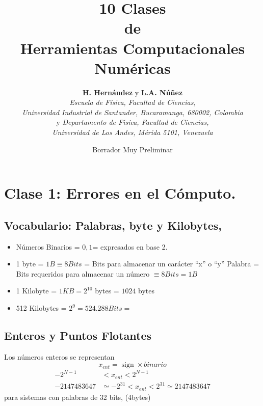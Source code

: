 \documentclass[spanish,titlepage,11pt]{article}
\begin{document}
\title{\textbf{10 Clases }\\\textbf{de }\\\textbf{Herramientas Computacionales Num\'{e}ricas}}
\author{
\textbf{H. Hern\'{a}ndez} y \textbf{L.A. N\'{u}\~{n}ez}\\
\textit{Escuela de F\'isica, Facultad de Ciencias,} \\ \textit{Universidad Industrial de Santander, Bucaramanga, 680002, Colombia} \\ y 
\textit{Departamento de F\'{\i}sica, Facultad de Ciencias,} \\
\textit{Universidad de Los Andes, M\'{e}rida 5101, Venezuela}
} 
\date{Borrador Muy Preliminar}
\maketitle
\tableofcontents



\newpage

\section{\textbf{Clase 1: Errores en el C\'{o}mputo.}}

\subsection{Vocabulario: Palabras, byte y Kilobytes,}

\begin{itemize}
\item  N\'{u}meros Binarios = $0,1$= expresados en base 2.

\item 1 byte = $1B\equiv8Bits$ = Bits para almacenar un car\'{a}cter ``x'' o
``y'' Palabra = Bits requeridos para almacenar un n\'{u}mero $\equiv8Bits=1B$

\item 1 Kilobyte = $1KB=2^{10}$ bytes = $1024$ bytes

\item 512 Kilobytes = $2^{9}=524.288Bits=$
\end{itemize}

\subsection{Enteros y Puntos Flotantes}

Los n\'{u}meros enteros se representan
\begin{equation}
x_{ent}=\operatorname*{sign}\times binario
\end{equation}%
\begin{align}
-2^{N-1} &  <x_{ent}<2^{N-1}\\
-2147483647 &  \simeq-2^{31}<x_{ent}<2^{31}\simeq2147483647
\end{align}
para sistemas con palabras de 32 bits, (4bytes)
\end{document}
